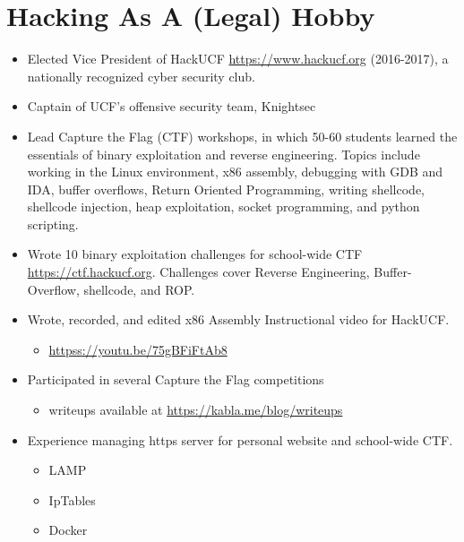 \documentclass[font = 23,a4paper,sans]{moderncv}
\begin{document}
\section{Hacking As A (Legal) Hobby} 
    \begin{itemize}

        \item Elected Vice President of HackUCF \url{https://www.hackucf.org} (2016-2017), a nationally recognized cyber security club. 

        \item Captain of UCF's offensive security team, Knightsec
        
        \item Lead Capture the Flag (CTF) workshops, in which 50-60 students learned the essentials of binary exploitation and reverse engineering. 
            Topics include working in the Linux environment, x86 assembly, debugging with GDB and IDA, buffer overflows, Return Oriented Programming, writing shellcode, shellcode injection, heap exploitation, socket programming, and python scripting. 
        
        \item Wrote 10 binary exploitation challenges for school-wide CTF \url{https://ctf.hackucf.org}. Challenges cover Reverse Engineering, Buffer-Overflow, shellcode, and ROP.

        \item Wrote, recorded, and edited x86 Assembly Instructional video for HackUCF. 
        \begin{itemize}
            \item \url{httpss://youtu.be/75gBFiFtAb8} 
        \end{itemize}

        \item  Participated in several Capture the Flag competitions
        \begin{itemize}
            \item writeups available at \url{https://kabla.me/blog/writeups} 

        \end{itemize}
        
    \item Experience managing https server for personal website and school-wide CTF. 
        \begin{itemize}
            \item LAMP
            \item IpTables
            \item Docker
        \end{itemize}
    
    \end{itemize}
\end{document}
